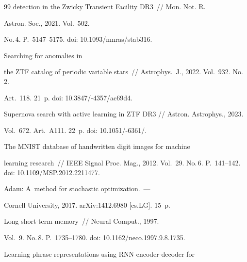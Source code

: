 {{\begin{thebibliography}{99}
detection in the Zwicky Transient Facility DR3~/\!\!/ Mon. Not. R. 

Astron. Soc., 2021. Vol.~502. 

No.\,4. P.~5147--5175. doi: 10.1093\!/\!mnras/stab316.








 Searching for anomalies in 

the ZTF catalog of periodic variable stars~/\!\!/ Astrophys.~J., 2022. Vol.~932. No.\,2. 

Art.~118. 21~p. doi: 10.3847\!/-4357\!/\!ac69d4.





{Supernova search with active learning in ZTF DR3} // Astron. Astrophys., 2023. 

Vol.~672. Art.~A111. 22~p. doi: 10.1051\!/-6361\!/.






 The MNIST database of handwritten digit images for machine 

learning research~/\!\!/ IEEE Signal Proc. Mag., 2012. Vol.~29. No.\,6. P.~141--142. doi: 10.1109\!/\!MSP.2012.2211477.




  Adam: A~method for stochastic optimization.~--- 

Cornell University, 2017. arXiv:1412.6980 [cs.LG]. 15~p.




 Long short-term memory~/\!\!/ Neural Comput., 1997. 

Vol.~9. No.\,8. P.~1735--1780. doi: 10.1162\!/\!neco.1997.9.8.1735.




 Learning phrase representations using RNN encoder-decoder for 


\end{thebibliography}}}
